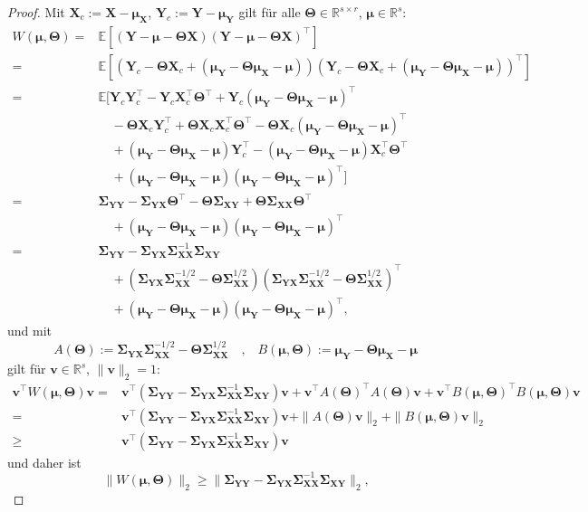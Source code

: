 \documentclass[]{article}
\newcommand{\E}{\mathbb{E}}
\newcommand{\R}{\mathbb{R}}
\newcommand{\X}{\mathbf{X}}
\newcommand{\Y}{\mathbf{Y}}
\newcommand{\T}{\mathbf{\Theta}}
\newcommand{\muu}{\bm{\mu}}
\newcommand{\Ssigma}{\mathbf{\Sigma}}
\newcommand{\vv}{\mathbf{v}}
\begin{document}
\begin{proof}
	Mit $\X_c := \X - \muu_\X$, $\Y_c := \Y - \muu_\Y$ gilt für alle $\T \in \R^{s \times r}$, $\muu \in \R^s$:
	\begin{align*}
		W(\muu, \T) ={}& \E[(\Y - \muu - \T \X)(\Y - \muu - \T \X)^\top] \\
		={}& \E[(\Y_c - \T \X_c + (\muu_\Y - \T \muu_\X - \muu))(\Y_c - \T \X_c + (\muu_\Y - \T \muu_\X - \muu))^\top] \\
		={}& \E[\Y_c \Y_c^\top - \Y_c \X_c^\top \T^\top + \Y_c (\muu_\Y - \T \muu_\X - \muu)^\top \\
		& \quad - \T \X_c \Y_c^\top + \T \X_c \X_c^\top \T^\top - \T \X_c (\muu_\Y - \T \muu_\X - \muu)^\top \\
		& \quad + (\muu_\Y - \T \muu_\X - \muu) \Y_c^\top - (\muu_\Y - \T \muu_\X - \muu) \X_c^\top \T^\top \\
		& \quad + (\muu_\Y - \T \muu_\X - \muu)(\muu_\Y - \T \muu_\X - \muu)^\top] \\
		={}& \Ssigma_{\Y\Y} - \Ssigma_{\Y\X} \T^\top - \T \Ssigma_{\X\Y} + \T \Ssigma_{\X\X} \T^\top \\
		& \quad + (\muu_\Y - \T \muu_\X - \muu)(\muu_\Y - \T \muu_\X - \muu)^\top \\
		={}& \Ssigma_{\Y\Y} - \Ssigma_{\Y\X} \Ssigma_{\X\X}^{-1} \Ssigma_{\X\Y} \\
		& \quad + (\Ssigma_{\Y\X} \Ssigma_{\X\X}^{-1/2} - \T \Ssigma_{\X\X}^{1/2})(\Ssigma_{\Y\X} \Ssigma_{\X\X}^{-1/2} - \T \Ssigma_{\X\X}^{1/2})^\top \\
		& \quad + (\muu_\Y - \T \muu_\X - \muu)(\muu_\Y - \T \muu_\X - \muu)^\top \text{,}
	\end{align*}
	und mit $$A(\T) := \Ssigma_{\Y\X} \Ssigma_{\X\X}^{-1/2} - \T \Ssigma_{\X\X}^{1/2} \quad \text{,} \quad B(\muu, \T) := \muu_\Y - \T \muu_\X - \muu$$ gilt für $\vv \in \R^s$, $\| \vv \|_2 = 1$:
	\begin{align*}
		\vv^\top W(\muu, \T) \vv ={}& \vv^\top (\Ssigma_{\Y\Y} - \Ssigma_{\Y\X} \Ssigma_{\X\X}^{-1} \Ssigma_{\X\Y}) \vv
		+ \vv^\top A(\T)^\top A(\T) \vv + \vv^\top B(\muu, \T)^\top B(\muu, \T) \vv \\
		={}& \vv^\top (\Ssigma_{\Y\Y} - \Ssigma_{\Y\X} \Ssigma_{\X\X}^{-1} \Ssigma_{\X\Y}) \vv
		+ \| A(\T) \vv \|_2 + \| B(\muu, \T) \vv \|_2 \\
		\geq{}& \vv^\top (\Ssigma_{\Y\Y} - \Ssigma_{\Y\X} \Ssigma_{\X\X}^{-1} \Ssigma_{\X\Y}) \vv
	\end{align*}
	und daher ist
	$$ \| W(\muu, \T) \|_2 \geq \| \Ssigma_{\Y\Y} - \Ssigma_{\Y\X} \Ssigma_{\X\X}^{-1} \Ssigma_{\X\Y} \|_2 \text{,}$$

\end{proof}
\end{document}
